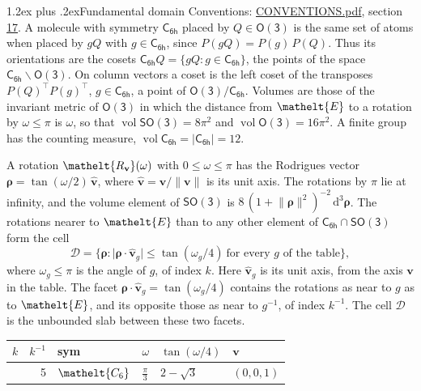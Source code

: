 \documentclass[10pt,a4paper]{article}
\makeatletter
\renewcommand\section{\@startsection{section}{1}{\z@}{-3ex plus -1ex minus -.2ex}%
  {1.2ex plus .2ex}{\normalfont\large\sffamily\bfseries\color{parttitle}}}
\numberwithin{equation}{section}
\newcommand{\eltfont}[1]{{\let\sigma\eltsigma\mathelt{#1}}}
\newcommand{\grp}[1]{\mathsf{#1}}
\newcommand{\cls}[1]{\eltfont{#1}}
\newcommand{\elt}[1]{\eltfont{#1}}
\newcommand{\dirvec}[3]{(#1, #2, #3)}
\newcommand{\unitaxis}{\hat{\mathbf{v}}}
\newcommand{\vv}{\mathbf{v}}
\newcommand{\diff}{\mathrm{d}}
\newcommand{\vol}{\operatorname{vol}}
\newcommand{\rodrigues}{\boldsymbol{\rho}}
\newcommand{\fcell}{\mathcal{D}}
\makeatother
\begin{document}
\section{Fundamental domain}\label{s:fundamental_domain}
Conventions: \href{../../CONVENTIONS.pdf}{CONVENTIONS.pdf}, section \href{../../CONVENTIONS.pdf\#conv.17}{17}.
\leavevmode\label{n:element.placement}A molecule with symmetry $\grp{C_{6h}}$ placed by $Q \in \grp{O(3)}$ is the same set of atoms when placed by $gQ$ with $g \in \grp{C_{6h}}$, since $P(gQ) = P(g)\,P(Q)$. \label{n:operator.cosets}Thus its orientations are the cosets $\grp{C_{6h}}Q = \{gQ : g \in \grp{C_{6h}}\}$, the points of the space $\grp{C_{6h}}\backslash\grp{O(3)}$. On column vectors a coset is the left coset of the transposes $P(Q)^{\top}P(g)^{\top}$, $g \in \grp{C_{6h}}$, a point of $\grp{O(3)}/\grp{C_{6h}}$.
\leavevmode\label{n:operator.volume}Volumes are those of the invariant metric of \href{O3.pdf}{$\grp{O(3)}$} in which the distance from $\elt{E}$ to a rotation by $\omega \le \pi$ is $\omega$, so that $\vol\grp{SO(3)} = 8\pi^2$ and $\vol\grp{O(3)} = 16\pi^2$. A finite group has the counting measure, $\vol\grp{C_{6h}} = |\grp{C_{6h}}| = 12$.

\leavevmode\label{n:vector.rodrigues}\label{n:vector.unitaxis}A rotation $\elt{R_{\vv}}(\omega)$ with $0 \le \omega \le \pi$ has the Rodrigues vector $\rodrigues = \tan(\omega/2)\,\unitaxis$, where $\unitaxis = \vv/\lVert\vv\rVert$ is its unit axis. The rotations by $\pi$ lie at infinity, and the volume element of \href{SO3.pdf}{$\grp{SO(3)}$} is $8\,(1 + \lVert\rodrigues\rVert^2)^{-2}\,\diff^3\rodrigues$.
\leavevmode\label{n:set.cell}The rotations nearer to $\elt{E}$ than to any other element of $\grp{C_{6h}} \cap \grp{SO(3)}$ form the cell
\begin{equation}\label{e:cell}\fcell = \bigl\{\rodrigues : \lvert\rodrigues\cdot\unitaxis_g\rvert \le \tan(\omega_g/4)\ \text{for every $g$ of the table}\bigr\},\end{equation}
where $\omega_g \le \pi$ is the angle of $g$, of index $k$. Here $\unitaxis_g$ is its unit axis, from the axis $\vv$ in the table. The facet $\rodrigues\cdot\unitaxis_g = \tan(\omega_g/4)$ contains the rotations as near to $g$ as to $\elt{E}$, and its opposite those as near to $g^{-1}$, of index $k^{-1}$. The cell $\fcell$ is the unbounded slab between these two facets.
{\small{\renewcommand{\arraystretch}{1.3}\begin{longtable}{@{}rrllll@{}}\toprule
$k$ & $k^{-1}$ & sym & $\omega$ & $\tan(\omega/4)$ & $\vv$\\\midrule\endhead
\bottomrule\endfoot\endlastfoot
1 & 5 & $\cls{C_{6}}$ & $\tfrac{\pi}{3}$ & $2 - \sqrt{3}$ & $\dirvec{0}{0}{1}$\\
\bottomrule\end{longtable}}}
\end{document}
